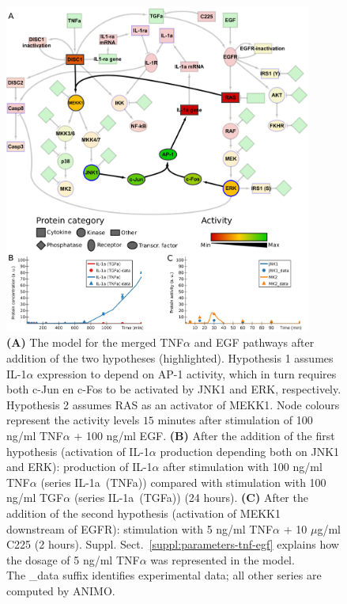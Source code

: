 \documentclass{bmcart}
\begin{document}
\begin{figure}[!htpb]
\begin{center}
  \includegraphics[width=0.9\textwidth]{images/large_network_legendg_completa}
\end{center}
\caption{
{\bf(A)} %
The model for the merged TNF$\alpha$ and EGF pathways
after addition of the two hypotheses (highlighted).
Hypothesis 1 assumes IL-1$\alpha$ expression to depend on AP-1 activity, which in turn requires
both c-Jun en c-Fos to be activated by JNK1 and ERK, respectively. Hypothesis 2 assumes RAS as an activator
of MEKK1. Node colours represent the activity levels $15$ minutes
after stimulation of 100 ng/ml TNF$\alpha$ + 100 ng/ml EGF.
{\bf(B)} %
After the addition of the first hypothesis (activation of IL-1$\alpha$ production depending both
on JNK1 and ERK): production of IL-1$\alpha$ after stimulation with 100 ng/ml TNF$\alpha$ (series {\sf IL-1a~(TNFa)})
compared with stimulation with 100 ng/ml TGF$\alpha$ (series {\sf IL-1a~(TGFa)}) (24 hours).
{\bf(C)} %
After the addition of the second hypothesis (activation of MEKK1 downstream of EGFR):
stimulation with 5 ng/ml TNF$\alpha$ + 10 $\mu$g/ml C225 (2 hours).
Suppl. Sect.~\ref{suppl:parameters-tnf-egf} explains how the dosage of 5 ng/ml TNF$\alpha$ was represented in the model.\\
The {\sf \_{}data} suffix identifies experimental data; all other series are computed by ANIMO.}\label{fig:large-model-complete}
\end{figure}
\end{document}
